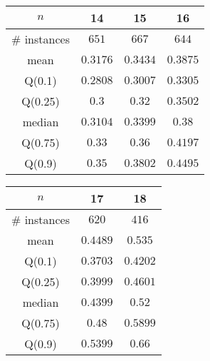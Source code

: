 \begin{tabular}{c|ccc} 
\hline 
$n$ & 14 & 15 & 16 \tabularnewline 
\hline 
\hline 
\# instances & $651$ & $667$ & $644$ \tabularnewline 
mean & $0.3176$ & $0.3434$ & $0.3875$ \tabularnewline 
Q(0.1) & $0.2808$ & $0.3007$ & $0.3305$ \tabularnewline 
Q(0.25) & $0.3$ & $0.32$ & $0.3502$ \tabularnewline 
median & $0.3104$ & $0.3399$ & $0.38$ \tabularnewline 
Q(0.75) & $0.33$ & $0.36$ & $0.4197$ \tabularnewline 
Q(0.9) & $0.35$ & $0.3802$ & $0.4495$ \tabularnewline 
\hline 
\end{tabular} 
\medskip{} 

\begin{tabular}{c|cc} 
\hline 
$n$ & 17 & 18 \tabularnewline 
\hline 
\hline 
\# instances & $620$ & $416$ \tabularnewline 
mean & $0.4489$ & $0.535$ \tabularnewline 
Q(0.1) & $0.3703$ & $0.4202$ \tabularnewline 
Q(0.25) & $0.3999$ & $0.4601$ \tabularnewline 
median & $0.4399$ & $0.52$ \tabularnewline 
Q(0.75) & $0.48$ & $0.5899$ \tabularnewline 
Q(0.9) & $0.5399$ & $0.66$ \tabularnewline 
\hline 
\end{tabular} 
\medskip{} 

